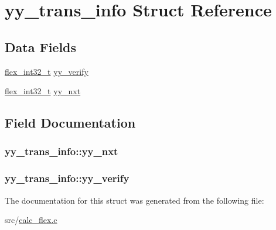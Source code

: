 \hypertarget{structyy__trans__info}{\section{yy\+\_\+trans\+\_\+info Struct Reference}
\label{structyy__trans__info}
}
\subsection*{Data Fields}
\begin{DoxyCompactItemize}
\item 
\hyperlink{calc__flex_8c_a838ce943cf44ef7769480714fc6c3ba9}{flex\+\_\+int32\+\_\+t} \hyperlink{structyy__trans__info_a5c9f61e770deef50bd4e697310342fe9}{yy\+\_\+verify}
\item 
\hyperlink{calc__flex_8c_a838ce943cf44ef7769480714fc6c3ba9}{flex\+\_\+int32\+\_\+t} \hyperlink{structyy__trans__info_ae0715250c2bef261e596e77e0030f13e}{yy\+\_\+nxt}
\end{DoxyCompactItemize}


\subsection{Field Documentation}
\hypertarget{structyy__trans__info_ae0715250c2bef261e596e77e0030f13e}{
\subsubsection[{yy\+\_\+nxt}]{ yy\+\_\+trans\+\_\+info\+::yy\+\_\+nxt}}\label{structyy__trans__info_ae0715250c2bef261e596e77e0030f13e}
\hypertarget{structyy__trans__info_a5c9f61e770deef50bd4e697310342fe9}{
\subsubsection[{yy\+\_\+verify}]{ yy\+\_\+trans\+\_\+info\+::yy\+\_\+verify}}\label{structyy__trans__info_a5c9f61e770deef50bd4e697310342fe9}


The documentation for this struct was generated from the following file\+:\begin{DoxyCompactItemize}
\item 
src/\hyperlink{calc__flex_8c}{calc\+\_\+flex.\+c}\end{DoxyCompactItemize}
